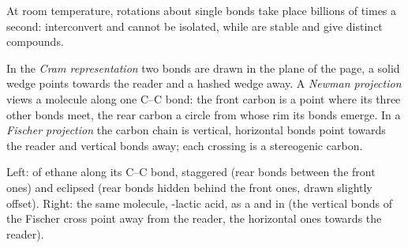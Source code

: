 At room temperature, rotations about single bonds take place billions of
times a second:  interconvert and cannot be isolated, while
 are stable and give distinct compounds.

\begin{definition}[Representations]\label{def:b1:stereochemistry-in-depth:representations}
In the \emph{Cram representation} two bonds
are drawn in the plane of the page, a solid wedge points towards the
reader and a hashed wedge away. A \emph{Newman projection}
views a molecule along one C--C bond: the front carbon is a
point where its three other bonds meet, the rear carbon a circle from
whose rim its bonds emerge. In a \emph{Fischer projection}
the carbon chain is vertical, horizontal bonds point towards
the reader and vertical bonds away; each crossing is a stereogenic carbon.
\end{definition}

\begin{omfigure}

{\small Left:  of ethane along its C--C bond, staggered
(rear bonds between the front ones) and eclipsed (rear bonds hidden
behind the front ones, drawn slightly offset). Right: the same molecule,
-lactic acid, as a  and in 
(the vertical bonds of the Fischer cross point away from the reader, the
horizontal ones towards the reader).}
\end{omfigure}

